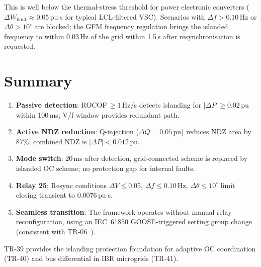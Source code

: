 \documentclass[11pt,a4paper]{article}
\begin{document}
This is well below the thermal-stress threshold for power electronic converters
($\Delta W_\mathrm{limit}\approx0.05$\,pu$\cdot$s for typical LCL-filtered VSC).
Scenarios with $\Delta f>0.10$\,Hz or $\Delta\theta>10^\circ$ are blocked; the
GFM frequency regulation brings the islanded frequency to within 0.03\,Hz of
the grid within 1.5\,s after resynchronisation is requested.

\section{Summary}
\label{sec:summary}

\begin{enumerate}
  \item \textbf{Passive detection}: ROCOF\,$\geq1$\,Hz/s detects islanding for
    $|\Delta P|\geq0.02$\,pu within 100\,ms; V/f window provides redundant path.

  \item \textbf{Active NDZ reduction}: Q-injection ($\Delta Q=0.05$\,pu) reduces
    NDZ area by 87\%; combined NDZ is $|\Delta P|<0.012$\,pu.

  \item \textbf{Mode switch}: 20\,ms after detection, grid-connected scheme is
    replaced by islanded OC scheme; no protection gap for internal faults.

  \item \textbf{Relay 25}: Resync conditions $\Delta V\leq0.05$, $\Delta f\leq0.10$\,Hz,
    $\Delta\theta\leq10^\circ$ limit closing transient to $0.0076$\,pu$\cdot$s.

  \item \textbf{Seamless transition}: The framework operates without manual
    relay reconfiguration, using an IEC~61850 GOOSE-triggered setting group
    change (consistent with TR-06~\cite{SAMBP_TR35}).
\end{enumerate}

\noindent
TR-39 provides the islanding protection foundation for adaptive OC coordination
(TR-40) and bus differential in IBR microgrids (TR-41).



\end{document}
